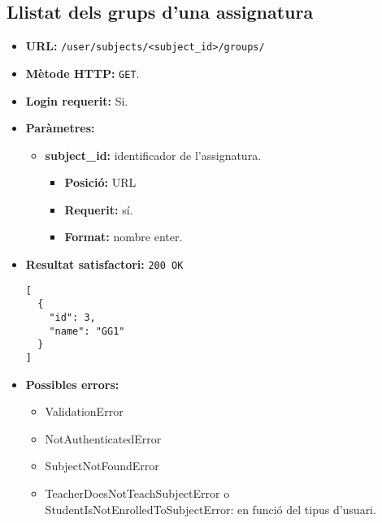 \subsection{Llistat dels grups d'una assignatura}
\begin{itemize}
\item \textbf{\ac{URL}:} \texttt{/user/subjects/<subject\_id>/groups/}
\item \textbf{Mètode \ac{HTTP}: } \texttt{GET}.
\item \textbf{Login requerit:} Si.
\item \textbf{Paràmetres:}
	\begin{itemize}
		\item \textbf{subject\_id:} identificador de l'assignatura.
		\begin{itemize}
			\item \textbf{Posició:} \ac{URL}
			\item \textbf{Requerit:} sí.
			\item \textbf{Format:} nombre enter.
		\end{itemize}
	\end{itemize}

\item \textbf{Resultat satisfactori:} \texttt{200 OK}
	\begin{verbatim}
[
  {
    "id": 3,
    "name": "GG1"
  }
]
	\end{verbatim}
	
	
\item \textbf{Possibles errors:}
	\begin{itemize}
		\item ValidationError
		\item NotAuthenticatedError
		\item SubjectNotFoundError
		\item TeacherDoesNotTeachSubjectError o StudentIsNotEnrolledToSubjectError: en funció del tipus d'usuari.
	\end{itemize}
\end{itemize}

